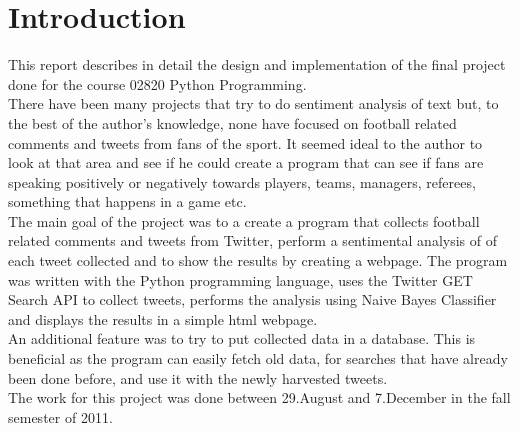 \chapter[Introduction]{Introduction}
\label{chap:Introduction}

This report describes in detail the design and implementation of the final project done for the course 02820 Python Programming.\\

There have been many projects that try to do sentiment analysis of text but, to the best of the author's knowledge, 
none have focused on football related comments and tweets from fans of the sport. It seemed ideal to the author to 
look at that area and see if he could create a program that can see if fans are speaking positively or negatively 
towards players, teams, managers, referees, something that happens in a game etc.\\

The main goal of the project was to a create a program that collects football related comments and tweets from Twitter,
perform a sentimental analysis of of each tweet collected and to show the results by creating a webpage. The program was
written with the Python programming language, uses the Twitter GET Search API to collect tweets, performs the analysis 
using Naive Bayes Classifier and displays the results in a simple html webpage.\\ 

An additional feature was to try to put collected data in a database. This is beneficial as the program can easily fetch
old data, for searches that have already been done before, and use it with the newly harvested tweets.\\

The work for this project was done between 29.August and 7.December in the fall semester of 2011.
